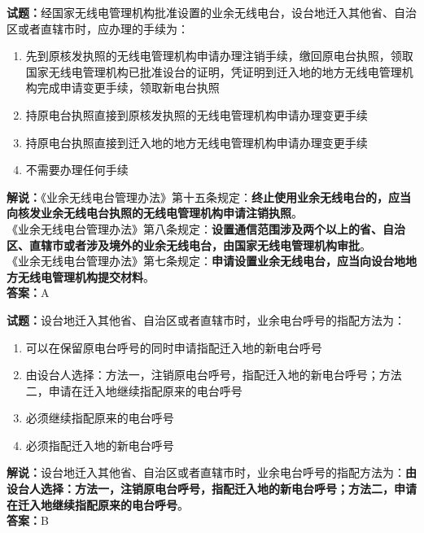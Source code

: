 \documentclass{ctexbook}
\begin{document}
\noindent\textbf{试题：}经国家无线电管理机构批准设置的业余无线电台，设台地迁入其他省、自治区或者直辖市时，应办理的手续为：
\begin{enumerate}[leftmargin=3em]
  \item 先到原核发执照的无线电管理机构申请办理注销手续，缴回原电台执照，领取国家无线电管理机构已批准设台的证明，凭证明到迁入地的地方无线电管理机构完成申请变更手续，领取新电台执照
  \item 持原电台执照直接到原核发执照的无线电管理机构申请办理变更手续
  \item 持原电台执照直接到迁入地的地方无线电管理机构申请办理变更手续
  \item 不需要办理任何手续
\end{enumerate}
\noindent\textbf{解说：}《业余无线电台管理办法》第十五条规定：\textbf{终止使用业余无线电台的，应当向核发业余无线电台执照的无线电管理机构申请注销执照}。\\
《业余无线电台管理办法》第八条规定：\textbf{设置通信范围涉及两个以上的省、自治区、直辖市或者涉及境外的业余无线电台，由国家无线电管理机构审批}。\\
《业余无线电台管理办法》第七条规定：\textbf{申请设置业余无线电台，应当向设台地地方无线电管理机构提交材料}。\\\noindent\textbf{答案：}A

\bigskip

\noindent\textbf{试题：}设台地迁入其他省、自治区或者直辖市时，业余电台呼号的指配方法为：
\begin{enumerate}[leftmargin=3em]
  \item 可以在保留原电台呼号的同时申请指配迁入地的新电台呼号
  \item 由设台人选择：方法一，注销原电台呼号，指配迁入地的新电台呼号；方法二，申请在迁入地继续指配原来的电台呼号
  \item 必须继续指配原来的电台呼号
  \item 必须指配迁入地的新电台呼号
\end{enumerate}
\noindent\textbf{解说：}设台地迁入其他省、自治区或者直辖市时，业余电台呼号的指配方法为：\textbf{由设台人选择：方法一，注销原电台呼号，指配迁入地的新电台呼号；方法二，申请在迁入地继续指配原来的电台呼号}。\\\noindent\textbf{答案：}B

\bigskip
\end{document}
